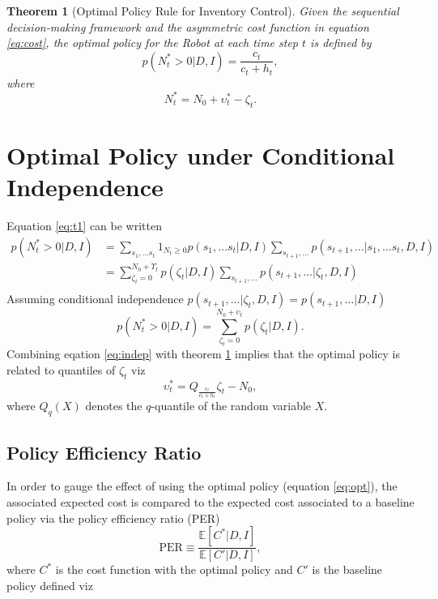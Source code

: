 \documentclass[a4paper,12pt]{article}
\newtheorem{theorem}{Theorem}
\begin{document}
	\begin{theorem}[Optimal Policy Rule for Inventory Control]
		\label{theorem:opt_policy}
		Given the sequential decision-making framework and the asymmetric cost function in equation \eqref{eq:cost}, the optimal policy for the Robot at each time step $t$ is defined by
		\begin{equation}
			p(N_t^* > 0 | D, I) = \frac{c_t}{c_t + h_t},
			\label{eq:t1}
		\end{equation}
		where
		\begin{equation}
			N_t^* = N_0 +\upsilon_t^*-\zeta_t.
		\end{equation}
	\end{theorem}
	
	
	\section{Optimal Policy under Conditional Independence}
	Equation \eqref{eq:t1} can be written
	\begin{equation}
		\begin{split}
			p(N_t^* > 0 | D, I) &= \sum_{s_1,\dots s_t}1_{N_{t}\geq 0}p(s_1,\dots s_t|D,I)\sum_{s_{t+1},\dots}p(s_{t+1},\dots|s_1,\dots s_t,D,I)\\
			& = \sum_{\zeta_t=0}^{N_0+\Upsilon_t}p(\zeta_t|D,I)\sum_{s_{t+1},\dots}p(s_{t+1},\dots|\zeta_t,D,I)\\
		\end{split}
	\end{equation}
	Assuming conditional independence $p(s_{t+1},\dots|\zeta_t,D,I)=p(s_{t+1},\dots|D,I)$
	\begin{equation}
			p(N_t^* > 0 | D, I)  = \sum_{\zeta_t=0}^{N_0+\upsilon_t}p(\zeta_t|D,I).
			\label{eq:indep}
	\end{equation}
	Combining eqation \eqref{eq:indep} with theorem \ref{theorem:opt_policy} implies that the optimal policy is related to quantiles of $\zeta_t$ viz
	\begin{equation}
		\upsilon_t^* = Q_{\frac{c_t}{c_t+h_t}}\zeta_t-N_0,
		\label{eq:opt}
	\end{equation}
	where $Q_q(X)$ denotes the $q$-quantile of the random variable $X$. 
	
	\subsection{Policy Efficiency Ratio}
	In order to gauge the effect of using the optimal policy (equation \eqref{eq:opt}), the associated expected cost is compared to the expected cost associated to a baseline policy via the policy efficiency ratio (PER)
	\begin{equation}
		\text{PER}\equiv \frac{\mathbb{E}[C^*|D,I]}{\mathbb{E}[C'|D,I]},
	\end{equation}
	where $C^*$ is the cost function with the optimal policy and $C'$ is the baseline policy defined viz
	
\end{document}
